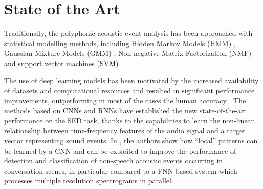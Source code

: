 %







\section{State of the Art}


Traditionally, the polyphonic acoustic event analysis has been approached with statistical modelling methods, including Hidden Markov Models (HMM) \cite{degara2011onset}, Gaussian Mixture Models (GMM) \cite{heittola2010audio}, Non-negative Matrix Factorization (NMF) \cite{carabias2011musical} and support vector machines (SVM) \cite{guo2003content}. 


The use of deep learning models has been motivated by the increased availability of datasets and computational resources and resulted in significant performance improvements, outperforming in most of the cases the human accuracy \cite{sailor2017unsupervised}.
The methods based on CNNs and RNNs have established the new state-of-the-art performance on the SED task, thanks to the capabilities to learn the non-linear relationship between time-frequency features of the audio signal and a target vector representing sound events. In \cite{espi2015}, the authors show how ``local'' patterns can be learned by a CNN and can be exploited to improve the performance of detection and classification of non-speech acoustic events occurring in conversation scenes, in particular compared to a FNN-based system which processes multiple resolution spectrograms in parallel. 



